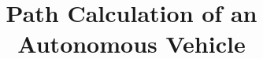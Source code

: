 \documentclass[11pt]{article}
\title{Path Calculation of an Autonomous Vehicle}
\author{\varAuthor}
\begin{document}
\maketitle

{}

\end{document}
